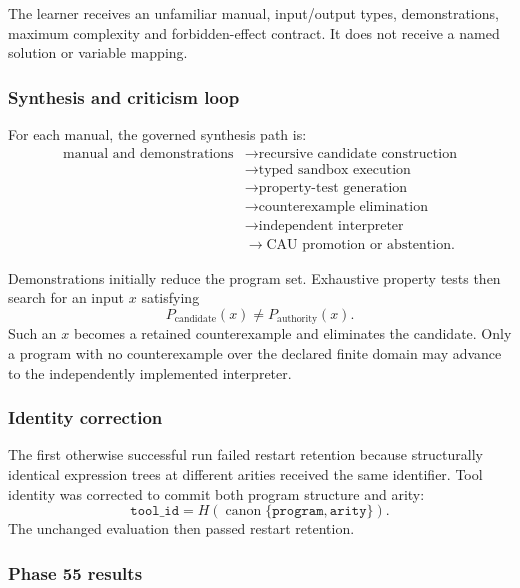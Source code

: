 The learner receives an unfamiliar manual, input/output types, demonstrations,
maximum complexity and forbidden-effect contract.  It does not receive a
named solution or variable mapping.

\subsubsection{Synthesis and criticism loop}

For each manual, the governed synthesis path is:
\[
\begin{aligned}
\text{manual and demonstrations}
&\rightarrow \text{recursive candidate construction}\\
&\rightarrow \text{typed sandbox execution}\\
&\rightarrow \text{property-test generation}\\
&\rightarrow \text{counterexample elimination}\\
&\rightarrow \text{independent interpreter}\\
&\rightarrow \text{CAU promotion or abstention}.
\end{aligned}
\]

Demonstrations initially reduce the program set.  Exhaustive property tests
then search for an input \(x\) satisfying
\[
P_{\mathrm{candidate}}(x)
\neq
P_{\mathrm{authority}}(x).
\]
Such an \(x\) becomes a retained counterexample and eliminates the candidate.
Only a program with no counterexample over the declared finite domain may
advance to the independently implemented interpreter.

\subsubsection{Identity correction}

The first otherwise successful run failed restart retention because
structurally identical expression trees at different arities received the
same identifier.  Tool identity was corrected to commit both program
structure and arity:
\[
\texttt{tool\_id}
=
H\!\left(
\operatorname{canon}\{\texttt{program},\texttt{arity}\}
\right).
\]
The unchanged evaluation then passed restart retention.

\subsubsection{Phase 55 results}

